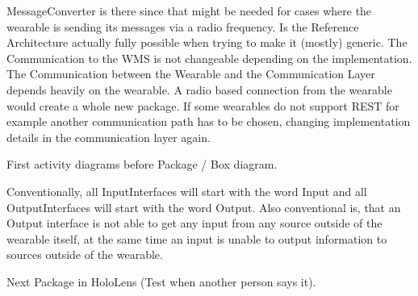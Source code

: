 \documentclass{report}
\begin{document}
MessageConverter is there since that might be needed for cases where the wearable is sending its messages via a radio frequency.
Is the Reference Architecture actually fully possible when trying to make it (mostly) generic.
The Communication to the WMS is not changeable depending on the implementation. The Communication between the Wearable and the Communication Layer depends heavily on the wearable. A radio based connection from the wearable would create a whole new package. If some wearables do not support REST for example another communication path has to be chosen, changing implementation details in the communication layer again.

First activity diagrams before Package / Box diagram.

Conventionally, all InputInterfaces will start with the word Input and all OutputInterfaces will start with the word Output. Also conventional is, that an Output interface is not able to get any input from any source outside of the wearable itself, at the same time an input is unable to output information to sources outside of the wearable.

Next Package in HoloLens (Test when another person says it).
\end{document}

